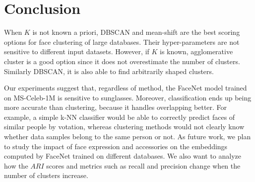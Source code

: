 \documentclass[conference]{IEEEtran}
\begin{document}
\section{Conclusion}

When $K$ is not known a priori, DBSCAN and mean-shift are the best scoring options for face clustering of large databases.
Their hyper-parameters are not sensitive to different input datasets.
However, if $K$ is known, agglomerative cluster is a good option since it does not overestimate the number of clusters.
Similarly DBSCAN, it is also able to find arbitrarily shaped clusters.

Our experiments suggest that, regardless of method, the FaceNet model trained on MS-Celeb-1M is sensitive to sunglasses.
Moreover, classification ends up being more accurate than clustering, because it handles overlapping better.
For example, a simple k-NN classifier would be able to correctly predict faces of similar people by votation, whereas clustering methods would not clearly know whether data samples belong to the same person or not.
As future work, we plan to study the impact of face expression and accessories on the embeddings computed by FaceNet trained on different databases.
We also want to analyze how the $ARI$ scores and metrics such as recall and precision change when the number of clusters increase.
\end{document}
